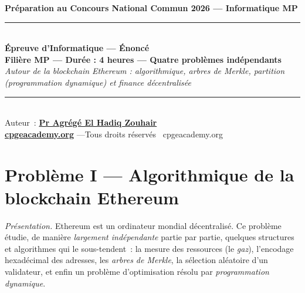 \documentclass[11pt,a4paper]{article}
\newcounter{qcnt}
\begin{document}
\begin{center}
{\large\bfseries Préparation au Concours National Commun 2026 --- Informatique MP}\\[8pt]
\rule{0.9\linewidth}{0.5pt}\\[6pt]
{\Large\bfseries Épreuve d'Informatique --- Énoncé}\\[4pt]
{\bfseries Filière MP --- Durée : 4 heures --- Quatre problèmes indépendants}\\[6pt]
{\itshape Autour de la blockchain Ethereum : algorithmique, arbres de Merkle, partition (programmation dynamique) et finance décentralisée}\\[6pt]
\rule{0.9\linewidth}{0.5pt}\\[8pt]
{\small Auteur~: \href{https://orcid.org/0000-0002-6108-7176}{\textbf{Pr Agrégé El Hadiq Zouhair}}}\\[3pt]
{\small \href{https://cpgeacademy.org}{\textbf{cpgeacademy.org}} \quad---\quad Tous droits réservés \textcopyright\ cpgeacademy.org}
\end{center}
\medskip
\begin{center}
\end{center}
\bigskip

\setcounter{qcnt}{0}

\section*{Problème I --- Algorithmique de la blockchain Ethereum}
\noindent\emph{Présentation.} Ethereum est un ordinateur mondial décentralisé. Ce problème étudie, de manière \emph{largement
indépendante} partie par partie, quelques structures et algorithmes qui le sous-tendent~: la
mesure des ressources (le \emph{gaz}), l'encodage hexadécimal des adresses, les \emph{arbres de
Merkle}, la sélection aléatoire d'un validateur, et enfin un problème d'optimisation résolu par
\emph{programmation dynamique}.
\end{document}
